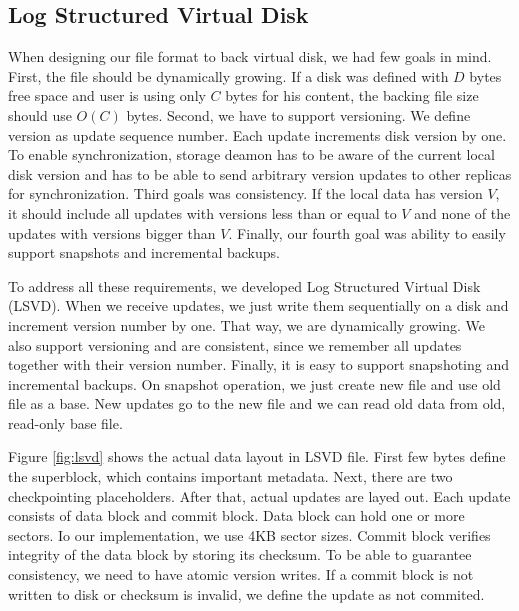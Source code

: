 \subsection{Log Structured Virtual Disk}
\label{sec:lsvd}

When designing our file format to back virtual disk, we had few goals in mind. First, the file should be dynamically growing. If a disk was defined with $D$ bytes free space and user is using only $C$ bytes for his content, the backing file size should use $O(C)$ bytes. Second, we have to support versioning. We define version as update sequence number. Each update increments disk version by one. To enable synchronization, storage deamon has to be aware of the current local disk version and has to be able to send arbitrary version updates to other replicas for synchronization. Third goals was consistency. If the local data has version $V$, it should include all updates with versions less than or equal to $V$ and none of the updates with versions bigger than $V$. Finally, our fourth goal was ability to easily support snapshots and incremental backups.

To address all these requirements, we developed Log Structured Virtual Disk (LSVD). When we receive updates, we just write them sequentially on a disk and increment version number by one. That way, we are dynamically growing. We also support versioning and are consistent, since we remember all updates together with their version number. Finally, it is easy to support snapshoting and incremental backups. On snapshot operation, we just create new file and use old file as a base. New updates go to the new file and we can read old data from old, read-only base file.

Figure \ref{fig:lsvd} shows the actual data layout in LSVD file. First few bytes define the superblock, which contains important metadata. Next, there are two checkpointing placeholders. After that, actual updates are layed out. Each update consists of data block and commit block. Data block can hold one or more sectors. Io our implementation, we use 4KB sector sizes. Commit block verifies integrity of the data block by storing its checksum. To be able to guarantee consistency, we need to have atomic version writes. If a commit block is not written to disk or checksum is invalid, we define the update as not commited.

